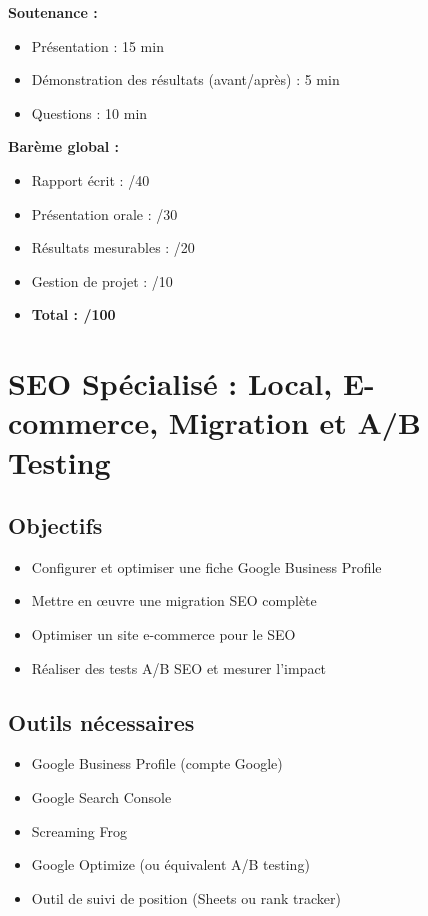 \documentclass[12pt,a4paper]{report}
\begin{document}
\textbf{Soutenance :}
\begin{itemize}
\item Présentation : 15 min
\item Démonstration des résultats (avant/après) : 5 min
\item Questions : 10 min
\end{itemize}

\textbf{Barème global :}
\begin{itemize}
\item Rapport écrit : /40
\item Présentation orale : /30
\item Résultats mesurables : /20
\item Gestion de projet : /10
\item \textbf{Total : /100}
\end{itemize}

\chapter{SEO Spécialisé : Local, E-commerce, Migration et A/B Testing}

\section{Objectifs}
\begin{itemize}
\item Configurer et optimiser une fiche Google Business Profile
\item Mettre en œuvre une migration SEO complète
\item Optimiser un site e-commerce pour le SEO
\item Réaliser des tests A/B SEO et mesurer l'impact
\end{itemize}

\section{Outils nécessaires}
\begin{itemize}
\item Google Business Profile (compte Google)
\item Google Search Console
\item Screaming Frog
\item Google Optimize (ou équivalent A/B testing)
\item Outil de suivi de position (Sheets ou rank tracker)
\end{itemize}
\end{document}
